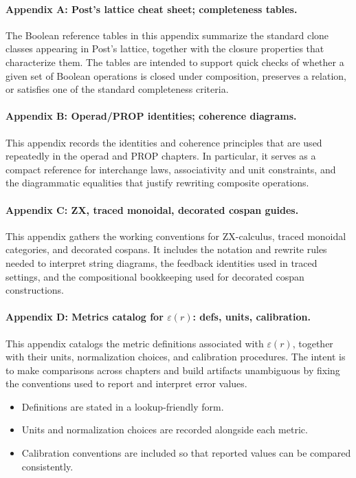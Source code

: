 \paragraph{Appendix A: Post's lattice cheat sheet; completeness tables.} The Boolean reference tables in this appendix summarize the standard clone classes appearing in Post's lattice, together with the closure properties that characterize them. The tables are intended to support quick checks of whether a given set of Boolean operations is closed under composition, preserves a relation, or satisfies one of the standard completeness criteria.

\paragraph{Appendix B: Operad/PROP identities; coherence diagrams.} This appendix records the identities and coherence principles that are used repeatedly in the operad and PROP chapters. In particular, it serves as a compact reference for interchange laws, associativity and unit constraints, and the diagrammatic equalities that justify rewriting composite operations.

\paragraph{Appendix C: ZX, traced monoidal, decorated cospan guides.} This appendix gathers the working conventions for ZX-calculus, traced monoidal categories, and decorated cospans. It includes the notation and rewrite rules needed to interpret string diagrams, the feedback identities used in traced settings, and the compositional bookkeeping used for decorated cospan constructions.

\paragraph{Appendix D: Metrics catalog for $\varepsilon(r)$: defs, units, calibration.} This appendix catalogs the metric definitions associated with $\varepsilon(r)$, together with their units, normalization choices, and calibration procedures. The intent is to make comparisons across chapters and build artifacts unambiguous by fixing the conventions used to report and interpret error values.

\begin{itemize}
  \item Definitions are stated in a lookup-friendly form.
  \item Units and normalization choices are recorded alongside each metric.
  \item Calibration conventions are included so that reported values can be compared consistently.
\end{itemize}

